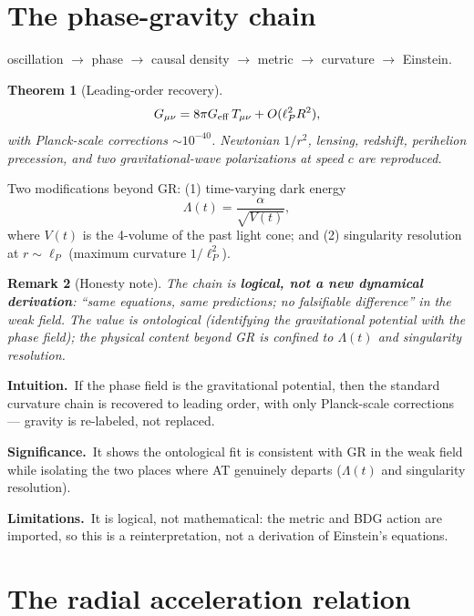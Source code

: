 \documentclass[10pt,twoside,openany]{book}
\newtheorem{theorem}{Theorem}[chapter]
\newtheorem{remark}[theorem]{Remark}
\newcommand{\theoremnotes}[3]{%
  \par\medskip\noindent
  \textbf{Intuition.}\ #1\par
  \textbf{Significance.}\ #2\par
  \textbf{Limitations.}\ #3\par}
\begin{document}
\section{The phase-gravity chain}

oscillation $\to$ phase $\to$ causal density $\to$ metric $\to$ curvature $\to$ Einstein.

\begin{theorem}[Leading-order recovery]
\begin{equation}
G_{\mu\nu} = 8\pi G_{\rm eff}\, T_{\mu\nu} + O(\ell_P^2 R^2),
\end{equation}
with Planck-scale corrections $\sim10^{-40}$. Newtonian $1/r^2$, lensing, redshift,
perihelion precession, and two gravitational-wave polarizations at speed $c$ are reproduced.
\end{theorem}

Two modifications beyond GR: (1) time-varying dark energy
\begin{equation}
\Lambda(t) = \frac{\alpha}{\sqrt{V(t)}},
\end{equation}
where $V(t)$ is the 4-volume of the past light cone; and (2) singularity resolution at
$r\sim\ell_P$ (maximum curvature $1/\ell_P^2$).

\begin{remark}[Honesty note]
The chain is \textbf{logical, not a new dynamical derivation}: ``same equations, same
predictions; no falsifiable difference'' in the weak field. The value is \emph{ontological}
(identifying the gravitational potential with the phase field); the physical content beyond
GR is confined to $\Lambda(t)$ and singularity resolution.
\end{remark}

\theoremnotes
{If the phase field is the gravitational potential, then the standard curvature chain is
recovered to leading order, with only Planck-scale corrections --- gravity is re-labeled,
not replaced.}
{It shows the ontological fit is consistent with GR in the weak field while isolating the
two places where AT genuinely departs ($\Lambda(t)$ and singularity resolution).}
{It is logical, not mathematical: the metric and BDG action are imported, so this is a
reinterpretation, not a derivation of Einstein's equations.}

\section{The radial acceleration relation}
\end{document}
